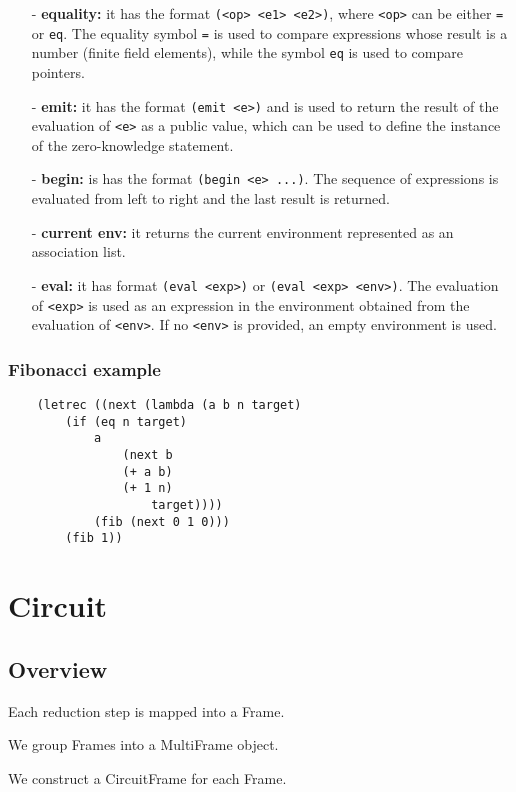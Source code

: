 \documentclass[10pt, english]{article}
\begin{document}
\begin{itemize}
  \item[-] \textbf{equality:} it has the format \verb|(<op> <e1> <e2>)|, where \verb|<op>| can be either \verb|=| or \verb|eq|. The equality symbol \verb|=| is used to compare expressions whose result is a number (finite field elements), while the symbol \verb|eq| is used to compare pointers.
  \item[-] \textbf{emit:} it has the format \verb|(emit <e>)| and is used to return the result of the evaluation of \verb|<e>| as a public value, which can be used to define the instance of the zero-knowledge statement.
  \item[-] \textbf{begin:} is has the format \verb|(begin <e> ...)|. The sequence of expressions is evaluated from left to right and the last result is returned.
  \item[-] \textbf{current env:} it returns the current environment represented as an association list.
  \item[-] \textbf{eval:} it has format \verb|(eval <exp>)| or \verb|(eval <exp> <env>)|. The evaluation of \verb|<exp>| is used as an expression in the environment obtained from the evaluation of \verb|<env>|. If no \verb|<env>| is provided, an empty environment is used.
\end{itemize}

\subsubsection{Fibonacci example}

\begin{verbatim}
    (letrec ((next (lambda (a b n target)
        (if (eq n target)
            a
                (next b
                (+ a b)
                (+ 1 n)
                    target))))
            (fib (next 0 1 0)))
        (fib 1))
\end{verbatim}

\section{Circuit}

\subsection{Overview}

Each reduction step is mapped into a Frame.

We group Frames into a MultiFrame object.

We construct a CircuitFrame for each Frame.
\end{document}
